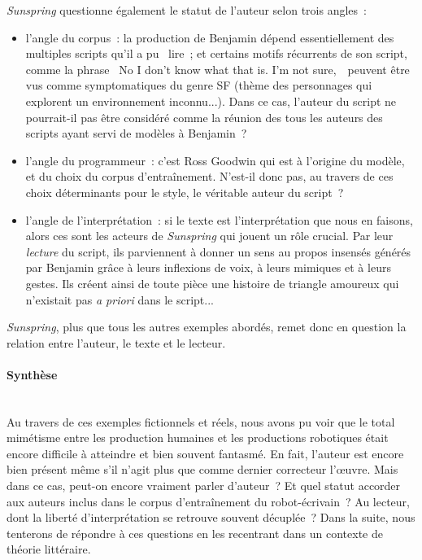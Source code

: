 \documentclass{article}
\newcommand{\subsubsubsection}[1]{\paragraph{#1}\mbox{}\\}
\begin{document}
					\textit{Sunspring} questionne également le statut de l'auteur selon trois angles~:
					\vspace{2mm}
					\begin{itemize}
						\item l'angle du corpus~: la production de Benjamin dépend essentiellement des multiples scripts qu'il a pu \guillemotleft~lire~\guillemotright; et certains motifs récurrents de son script, comme la phrase \guillemotleft~No I don’t know what that is. I’m not sure,~\guillemotright~peuvent être vus comme symptomatiques du genre SF (thème des personnages qui explorent un environnement inconnu...). Dans ce cas, l'auteur du script ne pourrait-il pas être considéré comme la réunion des tous les auteurs des scripts ayant servi de modèles à Benjamin~?
						\item l'angle du programmeur~: c'est Ross Goodwin qui est à l'origine du modèle, et du choix du corpus d'entraînement. N'est-il donc pas, au travers de ces choix déterminants pour le style, le véritable auteur du script~?
						\item l'angle de l'interprétation~: si le texte est l'interprétation que nous en faisons, alors ces sont les acteurs de \textit{Sunspring} qui jouent un rôle crucial. Par leur \textit{lecture} du script, ils parviennent à donner un sens au propos insensés générés par Benjamin grâce à leurs inflexions de voix, à leurs mimiques et à leurs gestes. Ils créent ainsi de toute pièce une histoire de triangle amoureux qui n'existait pas \textit{a priori} dans le script...
					\end{itemize}
					\vspace{2mm}
					\textit{Sunspring}, plus que tous les autres exemples abordés, remet donc en question la relation entre l'auteur, le texte et le lecteur.
				\subsubsubsection{Synthèse}
					Au travers de ces exemples fictionnels et réels, nous avons pu voir que le total mimétisme entre les production humaines et les productions robotiques était encore difficile à atteindre et bien souvent fantasmé. En fait, l'auteur est encore bien présent même s'il n'agit plus que comme dernier correcteur l'œuvre. Mais dans ce cas, peut-on encore vraiment parler d'auteur~? Et quel statut accorder aux auteurs inclus dans le corpus d'entraînement du robot-écrivain~? Au lecteur, dont la liberté d'interprétation se retrouve souvent décuplée~? Dans la suite, nous tenterons de répondre à ces questions en les recentrant dans un contexte de théorie littéraire.
\end{document}
